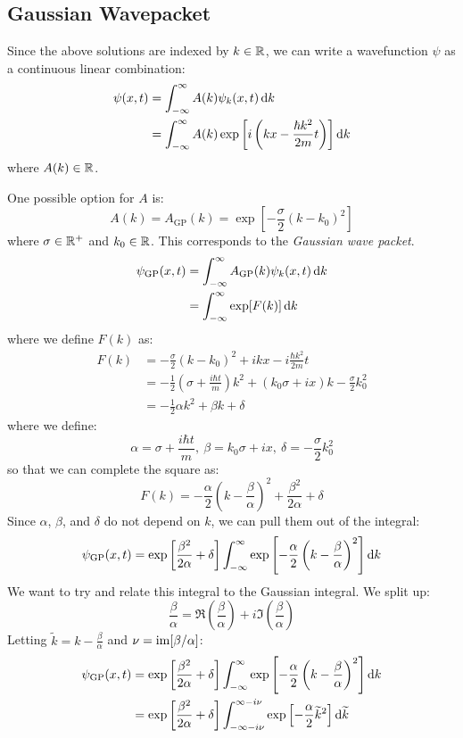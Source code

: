\documentclass[../main.tex]{subfiles}
\begin{document}
\subsection{Gaussian Wavepacket} \label{hUncertWP}
Since the above solutions are indexed by $k \in \mathbb{R}$, we can write a wavefunction $\psi$ as a continuous linear combination:
\begin{align*}
  \psi(x, t) &= \int_{-\infty}^{\infty} A(k) \psi_{k}(x, t) \d{k} \\
             &= \int_{-\infty}^{\infty} A(k) \exp\left[i\left(kx - \frac{\hbar k^2}{2m}t\right)\right] \d{k}
\end{align*}
where $A(k) \in \mathbb{R}$.

One possible option for $A$ is:
\[
  A(k) = A_{\text{GP}}(k) = \exp\left[-\frac{\sigma}{2}(k - k_0)^2\right]
\]
where $\sigma \in \mathbb{R}^{+}$ and $k_0 \in \mathbb{R}$.
This corresponds to the \textit{Gaussian wave packet}.
\begin{align*}
  \psi_{\text{GP}}(x, t) &= \int_{-\infty}^{\infty} A_{\text{GP}}(k) \psi_k(x, t) \d{k} \\
                         &= \int_{-\infty}^{\infty} \exp[F(k)] \d{k}
\end{align*}
where we define $F(k)$ as:
\begin{align*}
  F(k) &= - \frac{\sigma}{2}(k - k_0)^2 + ikx - i \frac{\hbar k^2}{2m} t \\
       &= - \frac{1}{2}\left(\sigma + \frac{i\hbar t}{m}\right)k^2 + (k_0 \sigma + ix)k - \frac{\sigma}{2}k^2_0 \\
       &= - \frac{1}{2} \alpha k^2 + \beta k + \delta
\end{align*}
where we define:
\[
  \alpha = \sigma + \frac{i\hbar t}{m},\ \beta = k_0 \sigma + ix,\ \delta = - \frac{\sigma}{2} k^2_0
\]
so that we can complete the square as:
\[
  F(k) = - \frac{\alpha}{2} \left(k - \frac{\beta}{\alpha}\right)^2 + \frac{\beta^2}{2\alpha} + \delta
\]
Since $\alpha$, $\beta$, and $\delta$ do not depend on $k$, we can pull them out of the integral:
\[
  \psi_{\text{GP}}(x, t) = \exp\left[\frac{\beta^2}{2\alpha} + \delta\right]  \int_{-\infty}^{\infty} \exp\left[-\frac{\alpha}{2}\left(k - \frac{\beta}{\alpha}\right)^2\right] \d{k}
\]
We want to try and relate this integral to the Gaussian integral.
We split up:
\[
  \frac{\beta}{\alpha} = \Re\left(\frac{\beta}{\alpha}\right) + i \Im\left(\frac{\beta}{\alpha}\right)
\]
Letting $\widetilde{k} = k - \frac{\beta}{\alpha}$ and $\nu = \operatorname{im}[\beta/\alpha]$:
\begin{align*}
  \psi_{\text{GP}}(x, t) &= \exp\left[\frac{\beta^2}{2\alpha} + \delta\right] \int_{-\infty}^{\infty} \exp\left[-\frac{\alpha}{2}\left(k - \frac{\beta}{\alpha}\right)^2\right] \d{k} \\
                         &= \exp\left[\frac{\beta^2}{2\alpha} + \delta\right] \int_{-\infty - i\nu}^{\infty - i\nu} \exp\left[-\frac{\alpha}{2}\widetilde{k}^2\right] \d{\widetilde{k}}
\end{align*}
\end{document}
